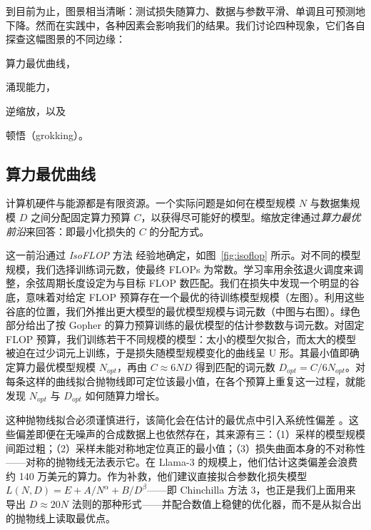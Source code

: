 到目前为止，图景相当清晰：测试损失随算力、数据与参数平滑、单调且可预测地下降。然而在实践中，各种因素会影响我们的结果。我们讨论四种现象，它们各自探查这幅图景的不同边缘：
\begin{enumerate*}[label=(\arabic*)]
    \item 算力最优曲线，
    \item 涌现能力，
    \item 逆缩放，以及
    \item 顿悟（grokking）。
\end{enumerate*}
    

\subsection{算力最优曲线}
计算机硬件与能源都是有限资源。一个实际问题是如何在模型规模 $N$ 与数据集规模 $D$ 之间分配固定算力预算 $C$，以获得尽可能好的模型。缩放定律通过\emph{算力最优前沿}来回答：即最小化损失的 $C$ 的分配方式。

这一前沿通过 \emph{IsoFLOP} 方法 \citep{10.5555/3600270.3602446} 经验地确定，如图~\ref{fig:isoflop} 所示。对不同的模型规模，我们选择训练词元数，使最终 FLOPs 为常数。学习率用余弦退火调度来调整，余弦周期长度设定为与目标 FLOP 数匹配。我们在损失中发现一个明显的谷底，意味着对给定 FLOP 预算存在一个最优的待训练模型规模（左图）。利用这些谷底的位置，我们外推出更大模型的最优模型规模与词元数（中图与右图）。绿色部分给出了按 Gopher 的算力预算训练的最优模型的估计参数数与词元数。对固定 FLOP 预算，我们训练若干不同规模的模型：太小的模型欠拟合，而太大的模型被迫在过少词元上训练，于是损失随模型规模变化的曲线呈 U 形。其最小值即确定算力最优模型规模 $N_{opt}$，再由 $C \approx 6ND$ 得到匹配的词元数 $D_{opt} = C / 6N_{opt}$。对每条这样的曲线拟合抛物线即可定位该最小值，在各个预算上重复这一过程，就能发现 $N_{opt}$ 与 $D_{opt}$ 如何随算力增长。

这种抛物线拟合必须谨慎进行，该简化会在估计的最优点中引入系统性偏差 \citep{czech2026problemschinchillaapproach2}。这些偏差即便在无噪声的合成数据上也依然存在，其来源有三：（1）采样的模型规模间距过粗；（2）采样未能对称地定位真正的最小值；（3）损失曲面本身的不对称性——对称的抛物线无法表示它。在 Llama-3 的规模上，他们估计这类偏差会浪费约 140 万美元的算力。作为补救，他们建议直接拟合参数化损失模型 $L(N,D) = E + A/N^{\alpha} + B/D^{\beta}$——即 Chinchilla 方法 3，也正是我们上面用来导出 $D \approx 20N$ 法则的那种形式——并配合数值上稳健的优化器，而不是从拟合出的抛物线上读取最优点。

